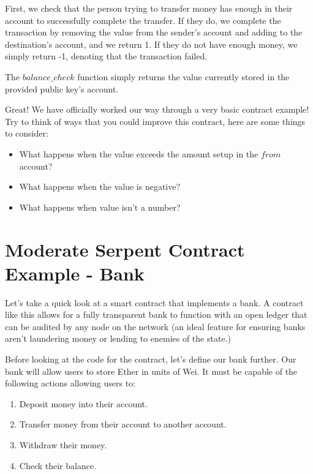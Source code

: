 \documentclass[12pt]{article}
\begin{document}
First, we check that the person trying to transfer money has enough in their account to successfully complete the transfer. If they do, we complete the transaction by removing the value from the sender's account and adding to the destination's account, and we return 1. If they do not have enough money, we simply return -1, denoting that the transaction failed. 

The $balance\_check$ function simply returns the value currently stored in the provided public key's account. 

Great! We have officially worked our way through a very basic contract example! Try to think of ways that you could improve this contract, here are some things to consider:

\begin{itemize}
\item What happens when the value exceeds the amount setup in the $from$ account?
\item What happens when the value is negative?
\item What happens when value isn't a number?
\end{itemize}

\cite{KenK'sFirstContractTutorial}

\section{Moderate Serpent Contract Example - Bank}

Let's take a quick look at a smart contract that implements a bank. A contract like this allows for a fully transparent bank to function with an open ledger that can be audited by any node on the network (an ideal feature for ensuring banks aren't laundering money or lending to enemies of the state.)

Before looking at the code for the contract, let's define our bank further. Our bank will allow users to store Ether in units of Wei. It must be capable of the following actions allowing users to:
\begin{enumerate}
\item Deposit money into their account.
\item Transfer money from their account to another account.
\item Withdraw their money.
\item Check their balance.
\end{enumerate}
\end{document}

